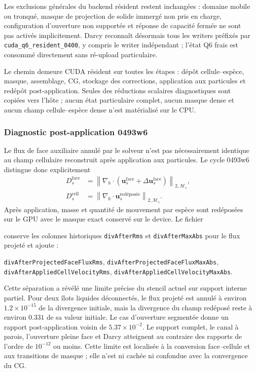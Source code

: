\documentclass[11pt,a4paper]{article}
\begin{document}
Les exclusions générales du backend résident restent inchangées : domaine mobile ou tronqué, masque de projection de solide immergé non pris en charge, configuration d'ouverture non supportée et réponse de capacité fermée ne sont pas activés implicitement. Darcy reconnaît désormais tous les writers préfixés par \texttt{cuda\_q6\_resident\_0400}, y compris le writer indépendant ; l'état Q6 frais est consommé directement sans ré-upload particulaire.

Le chemin demeure CUDA résident sur toutes les étapes : dépôt cellule--espèce, masque, assemblage, CG, stockage des corrections, application aux particules et redépôt post-application. Seules des réductions scalaires diagnostiques sont copiées vers l'hôte ; aucun état particulaire complet, aucun masque dense et aucun champ cellule--espèce dense n'est matérialisé sur le CPU.

\subsubsection{Diagnostic post-application 0493w6}

Le flux de face auxiliaire annulé par le solveur n'est pas nécessairement identique au champ cellulaire reconstruit après application aux particules. Le cycle 0493w6 distingue donc explicitement
\begin{align}
  D^{\mathrm{face}}_s
  &=\left\|\nabla_h\cdot
    \left(\bm u^{\mathrm{face}}_s+\Delta\bm u^{\mathrm{face}}_s\right)
    \right\|_{2,\mathcal M_s},\\
  D^{\mathrm{cell}}_s
  &=\left\|\nabla_h\cdot\bm u^{\mathrm{redéposée}}_s
    \right\|_{2,\mathcal M_s}.
\end{align}
Après application, masse et quantité de mouvement par espèce sont redéposées sur le GPU avec le masque exact conservé sur le device. Le fichier
\begin{center}
\end{center}
conserve les colonnes historiques \texttt{divAfterRms} et \texttt{divAfterMaxAbs} pour le flux projeté et ajoute :
\begin{center}
\texttt{divAfterProjectedFaceFluxRms},
\texttt{divAfterProjectedFaceFluxMaxAbs},\\
\texttt{divAfterAppliedCellVelocityRms},
\texttt{divAfterAppliedCellVelocityMaxAbs}.
\end{center}

Cette séparation a révélé une limite précise du stencil actuel sur support interne partiel. Pour deux îlots liquides déconnectés, le flux projeté est annulé à environ $1.2\times10^{-15}$ de la divergence initiale, mais la divergence du champ redéposé reste à environ $0.331$ de sa valeur initiale. Le cas d'ouverture segmentée donne un rapport post-application voisin de $5.37\times10^{-2}$. Le support complet, le canal à parois, l'ouverture pleine face et Darcy atteignent au contraire des rapports de l'ordre de $10^{-12}$ ou moins. Cette limite est localisée à la conversion face--cellule et aux transitions de masque ; elle n'est ni cachée ni confondue avec la convergence du CG.
\end{document}
